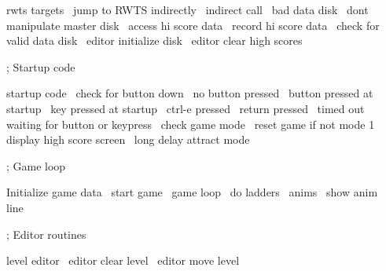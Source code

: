 \documentclass[10pt]{report}%
\begin{document}
    \LA{}rwts targets~{\nwtagstyle{}}\RA{}
    \LA{}jump to RWTS indirectly~{\nwtagstyle{}}\RA{}
    \LA{}indirect call~{\nwtagstyle{}}\RA{}
    \LA{}bad data disk~{\nwtagstyle{}}\RA{}
    \LA{}dont manipulate master disk~{\nwtagstyle{}}\RA{}
    \LA{}access hi score data~{\nwtagstyle{}}\RA{}
    \LA{}record hi score data~{\nwtagstyle{}}\RA{}
    \LA{}check for valid data disk~{\nwtagstyle{}}\RA{}
    \LA{}editor initialize disk~{\nwtagstyle{}}\RA{}
    \LA{}editor clear high scores~{\nwtagstyle{}}\RA{}

    ; Startup code

    \LA{}startup code~{\nwtagstyle{}}\RA{}
    \LA{}check for button down~{\nwtagstyle{}}\RA{}
    \LA{}no button pressed~{\nwtagstyle{}}\RA{}
    \LA{}button pressed at startup~{\nwtagstyle{}}\RA{}
    \LA{}key pressed at startup~{\nwtagstyle{}}\RA{}
    \LA{}ctrl-e pressed~{\nwtagstyle{}}\RA{}
    \LA{}return pressed~{\nwtagstyle{}}\RA{}
    \LA{}timed out waiting for button or keypress~{\nwtagstyle{}}\RA{}
    \LA{}check game mode~{\nwtagstyle{}}\RA{}
    \LA{}reset game if not mode 1~{\nwtagstyle{}}\RA{}
    \LA{}display high score screen~{\nwtagstyle{}}\RA{}
    \LA{}long delay attract mode~{\nwtagstyle{}}\RA{}

    ; Game loop

    \LA{}Initialize game data~{\nwtagstyle{}}\RA{}
    \LA{}start game~{\nwtagstyle{}}\RA{}
    \LA{}game loop~{\nwtagstyle{}}\RA{}
    \LA{}do ladders~{\nwtagstyle{}}\RA{}
    \LA{}anims~{\nwtagstyle{}}\RA{}
    \LA{}show anim line~{\nwtagstyle{}}\RA{}

    ; Editor routines

    \LA{}level editor~{\nwtagstyle{}}\RA{}
    \LA{}editor clear level~{\nwtagstyle{}}\RA{}
    \LA{}editor move level~{\nwtagstyle{}}\RA{}
\nwendcode{}\nwdocspar
\end{document}
